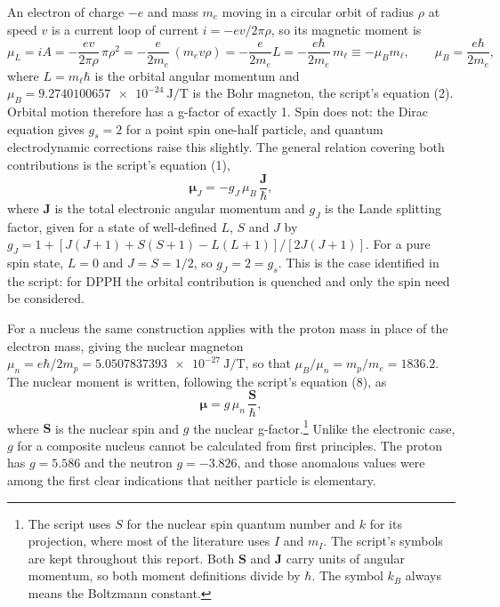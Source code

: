 \documentclass[11pt,a4paper]{article}
\begin{document}
An electron of charge $-e$ and mass $m_e$ moving in a circular orbit of radius $\rho$ at speed $v$
is a current loop of current $i = -ev/2\pi\rho$, so its magnetic moment is
\begin{equation}
\mu_L = iA = -\frac{ev}{2\pi\rho}\,\pi\rho^{2} = -\frac{e}{2m_e}\,(m_e v\rho) = -\frac{e}{2m_e}L
= -\frac{e\hbar}{2m_e}\,m_\ell \equiv -\mu_B m_\ell ,
\qquad
\mu_B = \frac{e\hbar}{2m_e} ,
\label{eq:bohr}
\end{equation}
where $L = m_\ell\hbar$ is the orbital angular momentum and
$\mu_B = \SI{9.2740100657e-24}{\joule\per\tesla}$ is the Bohr magneton, the script's equation (2).
Orbital motion therefore has a g-factor of exactly 1. Spin does not: the Dirac equation gives
$g_s = 2$ for a point spin one-half particle, and quantum electrodynamic corrections raise this
slightly. The general relation covering both contributions is the script's equation (1),
\begin{equation}
\boldsymbol{\mu}_J = -g_J\,\mu_B\,\frac{\mathbf{J}}{\hbar} ,
\label{eq:muJ}
\end{equation}
where $\mathbf{J}$ is the total electronic angular momentum and $g_J$ is the Lande splitting
factor, given for a state of well-defined $L$, $S$ and $J$ by
$g_J = 1 + [J(J+1) + S(S+1) - L(L+1)]/[2J(J+1)]$. For a pure spin state, $L = 0$ and $J = S = 1/2$,
so $g_J = 2 = g_s$. This is the case identified in the script: for DPPH the orbital contribution
is quenched and only the spin need be considered.

For a nucleus the same construction applies with the proton mass in place of the electron mass,
giving the nuclear magneton $\mu_n = e\hbar/2m_p = \SI{5.0507837393e-27}{\joule\per\tesla}$, so
that $\mu_B/\mu_n = m_p/m_e = 1836.2$. The nuclear moment is written, following the script's
equation (8), as
\begin{equation}
\boldsymbol{\mu} = g\,\mu_n\,\frac{\mathbf{S}}{\hbar} ,
\end{equation}
where $\mathbf{S}$ is the nuclear spin and $g$ the nuclear g-factor.\footnote{The script uses $S$
for the nuclear spin quantum number and $k$ for its projection, where most of the literature uses
$I$ and $m_I$. The script's symbols are kept throughout this report. Both $\mathbf{S}$ and
$\mathbf{J}$ carry units of angular momentum, so both moment definitions divide by $\hbar$. The
symbol $k_B$ always means the Boltzmann constant.} Unlike the electronic case, $g$ for a composite nucleus cannot be
calculated from first principles. The proton has $g = 5.586$ and the neutron $g = -3.826$, and
those anomalous values were among the first clear indications that neither particle is elementary.
\end{document}
